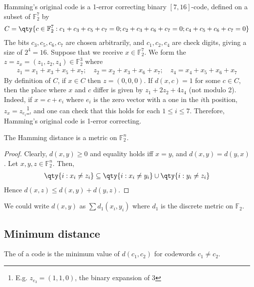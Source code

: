 \begin{example}
    Hamming's original code is a 1-error correcting binary $[7,16]$-code, defined on a subset of $\mathbb F_2^7$ by
    \begin{align*}
        C = \qty{c \in \mathbb F_2^7 : c_1 + c_3 + c_5 + c_7 = 0; c_2 + c_3 + c_6 + c_7 = 0; c_4 + c_5 + c_6 + c_7 = 0}
    \end{align*}
    The bits $c_3, c_5, c_6, c_7$ are chosen arbitrarily, and $c_1, c_2, c_4$ are check digits, giving a size of $2^4 = 16$.
    Suppose that we receive $x \in \mathbb F_2^7$.
    We form the  $z = z_x = (z_1, z_2, z_4) \in \mathbb F_2^3$ where
    \begin{align*}
        z_1 = x_1 + x_3 + x_5 + x_7;\quad z_2 = x_2 + x_3 + x_6 + x_7;\quad z_4 = x_4 + x_5 + x_6 + x_7
    \end{align*}
    By definition of $C$, if $x \in C$ then $z = (0, 0, 0)$.
    If $d(x,c) = 1$ for some $c \in C$, then the place where $x$ and $c$ differ is given by $z_1 + 2z_2 + 4z_4$ (not modulo 2).
    Indeed, if $x = c + e_i$ where $e_i$ is the zero vector with a one in the $i$th position, $z_x = z_{e_i}$\footnote{E.g. $z_{e_3} = (1, 1, 0)$, the binary expansion of $3$}, and one can check that this holds for each $1 \leq i \leq 7$.
    Therefore, Hamming's original code is 1-error correcting.
\end{example}

\begin{lemma}
    The Hamming distance is a metric on $\mathbb F_2^n$.
\end{lemma}

\begin{proof}
    Clearly, $d(x,y) \geq 0$ and equality holds iff $x = y$, and $d(x,y) = d(y,x)$.
    Let $x, y, z \in \mathbb F_2^n$.
    Then,
    \begin{align*}
        \qty{i : x_i \neq z_i} \subseteq \qty{i : x_i \neq y_i} \cup \qty{i : y_i \neq z_i}
    \end{align*}
    Hence $d(x,z) \leq d(x,y) + d(y,z)$.
\end{proof}
\begin{remark}
    We could write $d(x,y)$ as $\sum d_1(x_i,y_i)$ where $d_1$ is the discrete metric on $\mathbb F_2$.
\end{remark}

\subsection{Minimum distance}
\begin{definition}
    The  of a code is the minimum value of $d(c_1, c_2)$ for codewords $c_1 \neq c_2$.
\end{definition}

